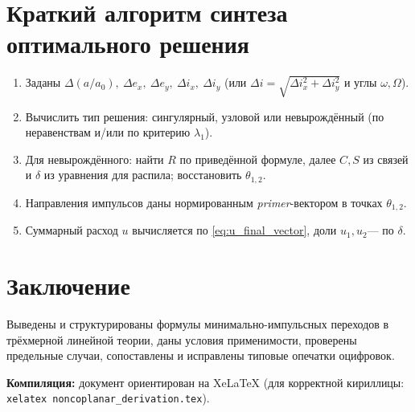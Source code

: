 \documentclass[12pt,a4paper]{article}
\begin{document}
\section{Краткий алгоритм синтеза оптимального решения}
\begin{enumerate}[label=\arabic*.]
\item Заданы $\Delta(a/a_0),\ \Delta e_x,\ \Delta e_y,\ \Delta i_x,\ \Delta i_y$ (или $\Delta i=\sqrt{\Delta i_x^2+\Delta i_y^2}$ и углы $\omega,\Omega$).
\item Вычислить тип решения: сингулярный, узловой или невырождённый (по неравенствам и/или по критерию $\lambda_1$).
\item Для невырождённого: найти $R$ по приведённой формуле, далее $C,S$ из связей и $\delta$ из уравнения для распила; восстановить $\theta_{1,2}$.
\item Направления импульсов даны нормированным \emph{primer}-вектором в точках $\theta_{1,2}$.
\item Суммарный расход $u$ вычисляется по \eqref{eq:u_final_vector}, доли $u_1,u_2$--- по $\delta$.
\end{enumerate}

\section*{Заключение}
Выведены и структурированы формулы минимально-импульсных переходов в трёхмерной линейной теории, даны условия применимости, проверены предельные случаи, сопоставлены и исправлены типовые опечатки оцифровок.

\vspace{1em}
\noindent\textbf{Компиляция:} документ ориентирован на XeLaTeX (для корректной кириллицы: \verb|xelatex noncoplanar_derivation.tex|).
\end{document}
